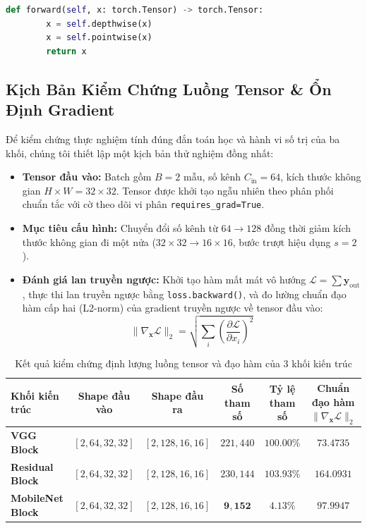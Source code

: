 \documentclass[12pt,a4paper]{report}
\begin{document}
\begin{lstlisting}[language=Python, caption={Cài đặt module hóa ba khối kiến trúc VGG, ResNet và MobileNet trong PyTorch}]
    def forward(self, x: torch.Tensor) -> torch.Tensor:
        x = self.depthwise(x)
        x = self.pointwise(x)
        return x
\end{lstlisting}

\subsection{Kịch Bản Kiểm Chứng Luồng Tensor \& Ổn Định Gradient}
Để kiểm chứng thực nghiệm tính đúng đắn toán học và hành vi số trị của ba khối, chúng tôi thiết lập một kịch bản thử nghiệm đồng nhất:
\begin{itemize}[leftmargin=*]
    \item \textbf{Tensor đầu vào:} Batch gồm $B=2$ mẫu, số kênh $C_{\text{in}}=64$, kích thước không gian $H \times W = 32 \times 32$. Tensor được khởi tạo ngẫu nhiên theo phân phối chuẩn tắc với cờ theo dõi vi phân \texttt{requires\_grad=True}.
    \item \textbf{Mục tiêu cấu hình:} Chuyển đổi số kênh từ $64 \to 128$ đồng thời giảm kích thước không gian đi một nửa ($32 \times 32 \to 16 \times 16$, bước trượt hiệu dụng $s=2$).
    \item \textbf{Đánh giá lan truyền ngược:} Khởi tạo hàm mất mát vô hướng $\mathcal{L} = \sum \mathbf{y}_{\text{out}}$, thực thi lan truyền ngược bằng \texttt{loss.backward()}, và đo lường chuẩn đạo hàm cấp hai (L2-norm) của gradient truyền ngược về tensor đầu vào:
    \begin{equation}
        \|\nabla_{\mathbf{x}} \mathcal{L}\|_2 = \sqrt{\sum_{i} \left(\frac{\partial \mathcal{L}}{\partial x_i}\right)^2}
    \end{equation}
\end{itemize}

\begin{table}[H]
\centering
\small
\caption{Kết quả kiểm chứng định lượng luồng tensor và đạo hàm của 3 khối kiến trúc}
\label{tab:pytorch_verification_results}
\begin{tabularx}{\textwidth}{lccccc}
\toprule
\textbf{Khối kiến trúc} & \textbf{Shape đầu vào} & \textbf{Shape đầu ra} & \textbf{Số tham số} & \textbf{Tỷ lệ tham số} & \textbf{Chuẩn đạo hàm $\|\nabla_{\mathbf{x}} \mathcal{L}\|_2$} \\
\midrule
\textbf{VGG Block} & $[2, 64, 32, 32]$ & $[2, 128, 16, 16]$ & $221,440$ & $100.00\%$ & $73.4735$ \\
\addlinespace
\textbf{Residual Block} & $[2, 64, 32, 32]$ & $[2, 128, 16, 16]$ & $230,144$ & $103.93\%$ & $164.0931$ \\
\addlinespace
\textbf{MobileNet Block} & $[2, 64, 32, 32]$ & $[2, 128, 16, 16]$ & $\mathbf{9,152}$ & $\mathbf{4.13\%}$ & $97.9947$ \\
\bottomrule
\end{tabularx}
\end{table}
\end{document}
